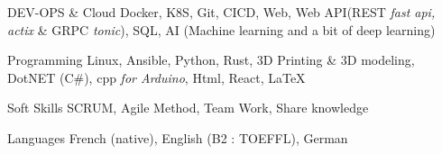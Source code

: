 

\begin{cvskills}

	\cvskill
	{DEV-OPS \& Cloud} %
	{Docker, K8S, Git, CICD, Web, Web API(REST \textit{fast api, actix} \& GRPC \textit{tonic}), SQL, AI (Machine learning and a bit of deep learning)} %

	\cvskill
	{Programming} %
    {Linux, Ansible, Python, Rust, 3D Printing \& 3D modeling, DotNET (C\#), cpp \textit{for Arduino}, Html, React, LaTeX} %

	\cvskill
	{Soft Skills} %
	{SCRUM, Agile Method, Team Work, Share knowledge} %

	\cvskill
	{Languages} %
	{French (native), English (B2 : TOEFFL), German} %

\end{cvskills}

